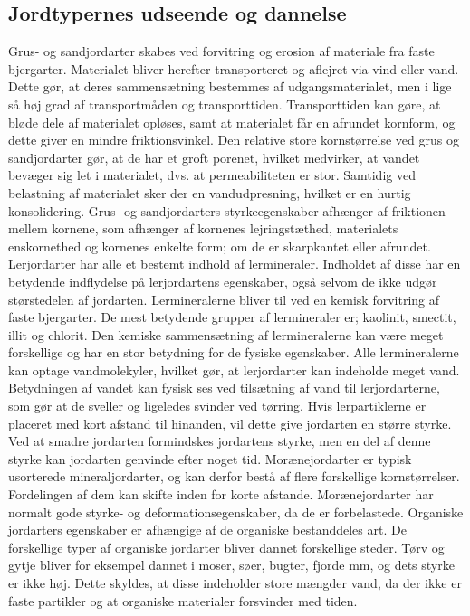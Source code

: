 \subsection{Jordtypernes udseende og dannelse}
Grus-  og sandjordarter skabes ved forvitring og erosion af materiale fra faste bjergarter. Materialet bliver herefter transporteret og aflejret via vind eller vand. Dette gør, at deres sammensætning bestemmes af udgangsmaterialet, men i lige så høj grad af transportmåden og transporttiden. Transporttiden kan gøre, at bløde dele af materialet opløses, samt at materialet får en afrundet kornform, og dette giver en mindre friktionsvinkel. Den relative store kornstørrelse ved grus og sandjordarter gør, at de har et groft porenet, hvilket medvirker, at vandet bevæger sig let i materialet,  dvs. at permeabiliteten er stor. Samtidig ved belastning af materialet sker der en vandudpresning, hvilket er en hurtig konsolidering.\citep{jordarter}
\newline \indent{     }  Grus- og sandjordarters styrkeegenskaber afhænger af friktionen mellem kornene, som afhænger af kornenes lejringstæthed, materialets enskornethed og kornenes enkelte form; om de er skarpkantet eller afrundet.\citep{jordarter} 
\newline \indent{     }  Lerjordarter har alle et bestemt indhold af lermineraler. Indholdet af disse har en betydende indflydelse på lerjordartens egenskaber, også selvom de ikke udgør størstedelen af jordarten. Lermineralerne bliver til ved en kemisk forvitring af faste bjergarter. De mest betydende grupper af lermineraler er; kaolinit, smectit, illit og chlorit. Den kemiske sammensætning af lermineralerne kan være meget forskellige og har en stor betydning for de fysiske egenskaber.\citep{jordarter} Alle lermineralerne kan optage vandmolekyler, hvilket gør, at lerjordarter kan indeholde meget vand. Betydningen af vandet kan fysisk ses ved tilsætning af vand til lerjordarterne, som gør at de sveller og ligeledes svinder ved tørring. Hvis lerpartiklerne er placeret med kort afstand til hinanden, vil dette give jordarten en større styrke.\citep{jordarter}  Ved at smadre jordarten formindskes jordartens styrke, men en del af denne styrke kan jordarten genvinde efter noget tid. \citep{jordarter}
\newline \indent{     }  Morænejordarter er typisk usorterede mineraljordarter, og kan derfor bestå af flere forskellige kornstørrelser. Fordelingen af dem kan skifte inden for korte afstande. Morænejordarter har normalt gode styrke- og deformationsegenskaber, da de er forbelastede.\citep{jordarter}
\newline \indent{     }  Organiske jordarters egenskaber er afhængige af de organiske bestanddeles art. De forskellige typer af organiske jordarter bliver dannet forskellige steder. Tørv og gytje bliver for eksempel dannet i moser, søer, bugter, fjorde mm, og dets styrke er ikke høj. Dette skyldes, at disse indeholder store mængder vand, da der ikke er faste partikler og at organiske materialer forsvinder med tiden. \citep{jordarter}

